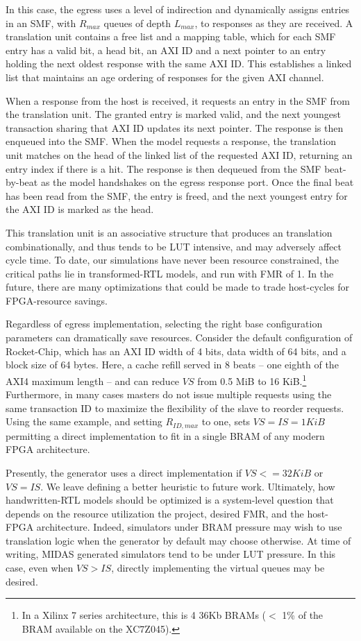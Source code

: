 In this case, the egress uses a level of indirection and dynamically assigns
entries in an SMF, with $R_{max}$ queues of depth $L_{max}$, to responses as
they are received. A translation unit contains a free list and a mapping table,
which for each SMF entry has a valid bit, a head bit, an AXI ID and a next
pointer to an entry holding the next oldest response with the same AXI ID. This
establishes a linked list that maintains an age ordering of responses for the
given AXI channel.

When a response from the host is received, it requests an entry in the SMF from
the translation unit. The granted entry is marked valid, and the next youngest
transaction sharing that AXI ID updates its next pointer.  The response is then
enqueued into the SMF. When the model requests a response, the translation unit
matches on the head of the linked list of the requested AXI ID, returning an
entry index if there is a hit. The response is then dequeued from the SMF
beat-by-beat as the model handshakes on the egress response port.  Once the
final beat has been read from the SMF, the entry is freed, and the next
youngest entry for the AXI ID is marked as the head.

This translation unit is an associative structure that produces an translation
combinationally, and thus tends to be LUT intensive, and may adversely affect
cycle time. To date, our simulations have never been resource constrained, the
critical paths lie in transformed-RTL models, and run with FMR of 1. In the
future, there are many optimizations that could be made to trade host-cycles for
FPGA-resource savings.

Regardless of egress implementation, selecting the right base configuration
parameters can dramatically save resources. Consider the default configuration
of Rocket-Chip, which has an AXI ID width of 4 bits, data width of 64 bits, and
a block size of 64 bytes. Here, a cache refill served in 8 beats -- one eighth
of the AXI4 maximum length -- and can reduce $VS$ from 0.5 MiB to 16
KiB.\footnote{In a Xilinx 7 series architecture, this is 4 36Kb BRAMs ($<$ 1\%
of the BRAM available on the XC7Z045).} Furthermore, in many cases masters do not
issue multiple requests using the same transaction ID to maximize the
flexibility of the slave to reorder requests. Using the same example, and
setting $R_{ID,max}$ to one, sets $VS = IS = 1 KiB$ permitting a direct
implementation to fit in a single BRAM of any modern FPGA architecture.

Presently, the generator uses a direct implementation if $VS <= 32 KiB$ or $VS
= IS$. We leave defining a better heuristic to future work. Ultimately, how
handwritten-RTL models should be optimized is a system-level question that
depends on the resource utilization the project, desired FMR, and
the host-FPGA architecture. Indeed, simulators under BRAM pressure may wish to use
translation logic when the generator by default may choose otherwise. At time
of writing, MIDAS generated simulators tend to be under LUT pressure. In this
case, even when $VS > IS$, directly implementing the virtual queues may be
desired.

